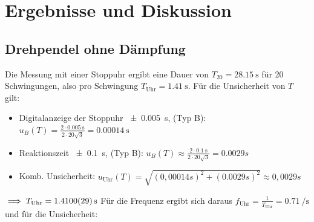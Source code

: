 \documentclass[
	a4paper,
	12pt,
	pagesize,
	ngerman
]{scrartcl}
\begin{document}
	\section{Ergebnisse und Diskussion}
	
	\subsection{Drehpendel ohne Dämpfung}
	Die Messung mit einer Stoppuhr ergibt eine Dauer von $T_{20} =\SI{28,15}{\second}$ für 20 Schwingungen, also pro Schwingung $ T_\text{Uhr} = \SI{1,41}{\second}$. %
	Für die Unsicherheit von \(T\) gilt: \\
	\begin{itemize}
		\item  Digitalanzeige der Stoppuhr \SI{\pm 0,005}{\second}, (Typ B): \( u_B(T) = \frac{2\cdot \SI{0,005}{\second}}{2 \cdot 20 \sqrt{3}} = \SI{0,00014}{\second} \)
		\item Reaktionszeit \SI{\pm 0,1}{\second}, (Typ B): \( u_B(T) \approx \frac{2\cdot \SI{0,1}{\second}}{2 \cdot 20 \sqrt{3}} = 0.0029\si{s} \)
		\item Komb. Unsicherheit: $ u_\text{Uhr}(T) = \sqrt{(0,00014\si{s})^2+(0.0029\si{s})^2} \approx 0,0029 \si{s} $
	\end{itemize} 
	$ \implies T_\text{Uhr} = \SI{1,41 \pm 0,0029}{\second} $ \newline 
	Für die Frequenz ergibt sich daraus $ f_\text{Uhr} = \frac{1}{T_\text{Uhr}} = \SI{0,71}{\per \second}$ und für die Unsicherheit: \newline
	
\end{document}
